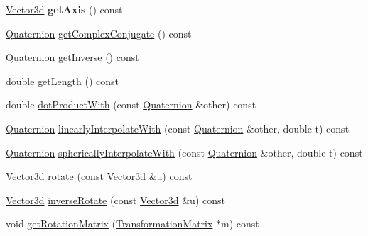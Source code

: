 \begin{DoxyCompactItemize}
\item 
\hypertarget{classCartWheel_1_1Math_1_1Quaternion_a0c30cccd493123f85201fbf54ade2b20}{
\hyperlink{classCartWheel_1_1Math_1_1Vector3d}{Vector3d} {\bfseries getAxis} () const }
\label{classCartWheel_1_1Math_1_1Quaternion_a0c30cccd493123f85201fbf54ade2b20}

\item 
\hyperlink{classCartWheel_1_1Math_1_1Quaternion}{Quaternion} \hyperlink{classCartWheel_1_1Math_1_1Quaternion_a601630e8a98e18fd1b8a43f2e845a9f4}{getComplexConjugate} () const 
\item 
\hyperlink{classCartWheel_1_1Math_1_1Quaternion}{Quaternion} \hyperlink{classCartWheel_1_1Math_1_1Quaternion_afe3c9a40a60ab64107d8dd7ab4228fce}{getInverse} () const 
\item 
double \hyperlink{classCartWheel_1_1Math_1_1Quaternion_add7502f562000c496aa3a9e34ee5f3c2}{getLength} () const 
\item 
double \hyperlink{classCartWheel_1_1Math_1_1Quaternion_a515282eb35ee7fb50cbc179e96ce434c}{dotProductWith} (const \hyperlink{classCartWheel_1_1Math_1_1Quaternion}{Quaternion} \&other) const 
\item 
\hyperlink{classCartWheel_1_1Math_1_1Quaternion}{Quaternion} \hyperlink{classCartWheel_1_1Math_1_1Quaternion_a78fcba74485cb0c364b8f06c983f8d8c}{linearlyInterpolateWith} (const \hyperlink{classCartWheel_1_1Math_1_1Quaternion}{Quaternion} \&other, double t) const 
\item 
\hyperlink{classCartWheel_1_1Math_1_1Quaternion}{Quaternion} \hyperlink{classCartWheel_1_1Math_1_1Quaternion_a59da7a7cd17477980d227590837ceaba}{sphericallyInterpolateWith} (const \hyperlink{classCartWheel_1_1Math_1_1Quaternion}{Quaternion} \&other, double t) const 
\item 
\hyperlink{classCartWheel_1_1Math_1_1Vector3d}{Vector3d} \hyperlink{classCartWheel_1_1Math_1_1Quaternion_a3b9e77a2f65cea67f5687b0c6dcf11c3}{rotate} (const \hyperlink{classCartWheel_1_1Math_1_1Vector3d}{Vector3d} \&u) const 
\item 
\hyperlink{classCartWheel_1_1Math_1_1Vector3d}{Vector3d} \hyperlink{classCartWheel_1_1Math_1_1Quaternion_a1d7ded1abcb1370373dd97dc4d40b9cb}{inverseRotate} (const \hyperlink{classCartWheel_1_1Math_1_1Vector3d}{Vector3d} \&u) const 
\item 
void \hyperlink{classCartWheel_1_1Math_1_1Quaternion_ad951159735ea47e13eb728424ffb64c2}{getRotationMatrix} (\hyperlink{classCartWheel_1_1Math_1_1TransformationMatrix}{TransformationMatrix} $\ast$m) const 
\item 

\end{DoxyCompactItemize}
